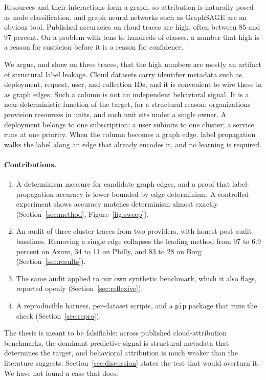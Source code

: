 \documentclass[11pt]{article}
\newcommand{\code}[1]{\texttt{#1}}
\begin{document}
Resources and their interactions form a graph, so attribution is naturally
posed as node classification, and graph neural networks such as GraphSAGE
\citep{hamilton2017graphsage} are an obvious tool. Published accuracies on
cloud traces are high, often between 85 and 97 percent. On a problem with tens
to hundreds of classes, a number that high is a reason for suspicion before it
is a reason for confidence.

We argue, and show on three traces, that the high numbers are mostly an
artifact of structural label leakage. Cloud datasets carry identifier metadata
such as deployment, request, user, and collection IDs, and it is convenient to
wire these in as graph edges. Such a column is not an independent behavioral
signal. It is a near-deterministic function of the target, for a structural
reason: organizations provision resources in units, and each unit sits under a
single owner. A deployment belongs to one subscription; a user submits to one
cluster; a service runs at one priority. When the column becomes a graph edge,
label propagation walks the label along an edge that already encodes it, and no
learning is required.

\paragraph{Contributions.}
\begin{enumerate}
  \item A determinism measure for candidate graph edges, and a proof that
  label-propagation accuracy is lower-bounded by edge determinism. A controlled
  experiment shows accuracy matches determinism almost exactly
  (Section~\ref{sec:method}, Figure~\ref{fig:sweep}).
  \item An audit of three cluster traces from two providers, with honest
  post-audit baselines. Removing a single edge collapses the leading method
  from 97 to 6.9 percent on Azure, 34 to 11 on Philly, and 83 to 28 on Borg
  (Section~\ref{sec:results}).
  \item The same audit applied to our own synthetic benchmark, which it also
  flags, reported openly (Section~\ref{sec:reflexive}).
  \item A reproducible harness, per-dataset scripts, and a \code{pip}
  package that runs the check (Section~\ref{sec:repro}).
\end{enumerate}

The thesis is meant to be falsifiable: across published cloud-attribution
benchmarks, the dominant predictive signal is structural metadata that
determines the target, and behavioral attribution is much weaker than the
literature suggests. Section~\ref{sec:discussion} states the test that would
overturn it. We have not found a case that does.
\end{document}
